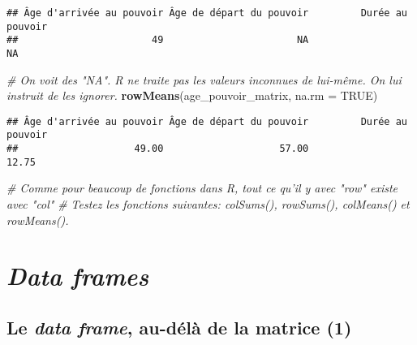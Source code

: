 \documentclass[]{book}
\newenvironment{Shaded}{\begin{snugshade}}{\end{snugshade}}
\newcommand{\KeywordTok}[1]{\textcolor[rgb]{0.13,0.29,0.53}{\textbf{#1}}}
\newcommand{\DataTypeTok}[1]{\textcolor[rgb]{0.13,0.29,0.53}{#1}}
\newcommand{\CommentTok}[1]{\textcolor[rgb]{0.56,0.35,0.01}{\textit{#1}}}
\newcommand{\OtherTok}[1]{\textcolor[rgb]{0.56,0.35,0.01}{#1}}
\newcommand{\NormalTok}[1]{#1}
\begin{document}
\begin{verbatim}
## Âge d'arrivée au pouvoir Âge de départ du pouvoir         Durée au pouvoir 
##                       49                       NA                       NA
\end{verbatim}

\begin{Shaded}
\begin{Highlighting}[]
\CommentTok{# On voit des "NA". R ne traite pas les valeurs inconnues de lui-même. On lui instruit de les ignorer.}
\KeywordTok{rowMeans}\NormalTok{(age_pouvoir_matrix, }\DataTypeTok{na.rm =} \OtherTok{TRUE}\NormalTok{)}
\end{Highlighting}
\end{Shaded}

\begin{verbatim}
## Âge d'arrivée au pouvoir Âge de départ du pouvoir         Durée au pouvoir 
##                    49.00                    57.00                    12.75
\end{verbatim}

\begin{Shaded}
\begin{Highlighting}[]
\CommentTok{# Comme pour beaucoup de fonctions dans R, tout ce qu'il y avec "row" existe avec "col" }
\CommentTok{# Testez les fonctions suivantes: colSums(), rowSums(), colMeans() et rowMeans().}
\end{Highlighting}
\end{Shaded}

\normalsize

\section{\texorpdfstring{\emph{Data
frames}}{Data frames}}\label{data-frames}

\subsection{\texorpdfstring{Le \emph{data frame}, au-délà de la matrice
(1)}{Le data frame, au-délà de la matrice (1)}}\label{le-data-frame-au-dela-de-la-matrice-1}

\tiny
\end{document}
